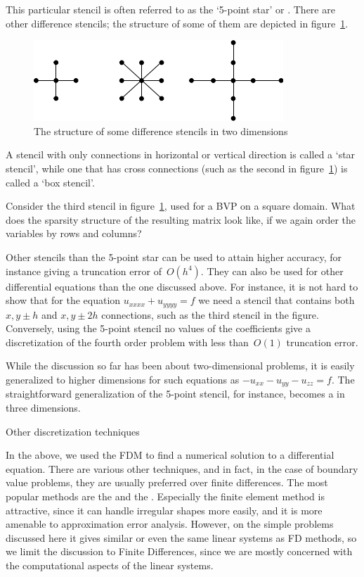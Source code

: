 This particular stencil is often referred to as
the `5-point star' or .
There are other difference stencils; the structure
of some of them are depicted in figure~\ref{fig:stencils}.
\begin{figure}[ht]
  \centering
  \includegraphics[scale=.8]{graphics/stencils}
  \caption{The structure of some difference stencils in two dimensions}
  \label{fig:stencils}
\end{figure}
A stencil with only connections in horizontal or vertical direction is
called a `star stencil', while one that has cross connections (such as
the second in figure~\ref{fig:stencils}) is called a `box
stencil'. 
\begin{exercise}
  Consider the third stencil in figure~\ref{fig:stencils}, used for a
  \ac{BVP} on a square domain.
  What does the sparsity structure of the resulting matrix look like,
  if we again order the variables by rows and columns?
\end{exercise}

Other stencils than the 5-point star can be used to attain higher
accuracy, for instance giving a truncation error of~$O(h^4)$. They can
also be used for other differential equations than the one discussed
above. For instance, it is not hard to show that for the equation
$u_{xxxx}+u_{yyyy}=f$ we need a stencil that contains both $x,y\pm h$
and $x,y\pm 2h$ connections, such as the third stencil in the
figure. Conversely, using the 5-point stencil no values of the
coefficients give a discretization of the fourth order problem with
less than~$O(1)$ truncation error.

While the discussion so far has been about two-dimensional
problems, it is easily generalized to higher dimensions for such
equations as $-u_{xx}-u_{yy}-u_{zz}=f$. The straightforward
generalization of the 5-point stencil, for instance, becomes a
%
in three dimensions.

 {Other discretization techniques}
\label{sec:fem}

In the above, we used the \ac{FDM} to find a numerical solution
to a differential equation. There are various other techniques, and in
fact, in the case of boundary value problems, they are usually
preferred over finite differences. The most popular methods are the
 and the . Especially the finite element method is attractive, since
it can handle irregular shapes more easily, and it is more amenable to
approximation error analysis. However, on the simple problems discussed here
it gives similar or even the same linear systems as \ac{FD} methods,
so we limit the discussion to Finite Differences, since we are mostly
concerned with the computational aspects of the linear systems.

